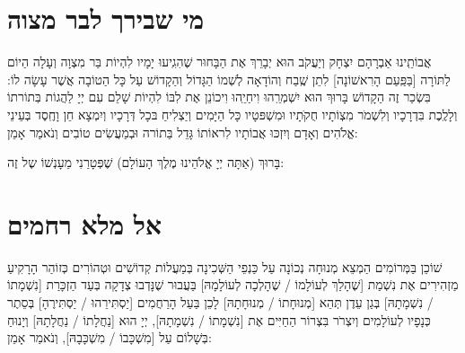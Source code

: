 \documentclass[a4paper, twoside, openany, parskip=half, 10pt]{article}
\begin{document}
\section*{מי שבירך לבר מצוה}
\vspace{-.5\baselineskip}
\begin{multicols}{2}
אֲבוֹתֵֽינוּ אַבְרָהָם יִצְחָק וְיַעֲקֹב הוּא יְבָרֵךְ אֶת הַבָּחוּר
 שֶׁהִגִֽיעוּ יָמָיו לִהְיוֹת בַּר מִצְוָה וְעָלָה הַיוֹם לַתּוֹרָה [בַּפַּֽעַם הָרִאשׁוֹנָה] לִתֵן שֶֽׁבַח וְהוֹדָאָה לְשְׁמוֹ הַגָּדוֹל וְהַקָדוֹשׁ עַל כָּל הַטוֹבָה אֲשֶׁר עָשָׂה לוֹ: בִּשְׂכַר זֶה הַקָדוֹשׁ בָּרוּךְ הוּא יִשְׁמְרֵֽהוּ וִיחַיֵֽהוּ וִיכוֹנֵן אֶת לִבּוֹ לִהְיוֹת שָׁלֵם עִם יְיָ לַהֲגוֹת בּֽתוֹרתוֹ וְלָלֶֽכֶת בִּדְרָכָיו וְלִשְׁמֹר מִצְוֹתָיו חֻקּׂתָיו וּמִשְׁפּטָיו כָּל הַיָּמִים
 וְיַצְלִיחַ בּכָל דְּרָכָיו וְיִמְצָא חֵן וָחֶֽסֶד בְּעֵינֵי אֱלֹהִים וְאָדָם וְיִזְכּוּ אֲבוֹתָיו לִראוֹתוֹ גָּדֵל בַּתוֹרה וּּבְמַעֲשִׂים טוֹבִים
  וְנֹאמַר אָמֵן:
\end{multicols}
בָּרוּךְ (אַתָּה יְיָ אֱלֹהֵינוּ מֶלֶךְ הָעוֹלָם) שֶׁפְּטָרַנִי מֵעָנְשׁוֹ שֶל זֶה:\\

\section*{אל מלא רחמים}
\vspace{-.5\baselineskip}
\begin{multicols}{2}
     שׁוֹכֵן בַּמְּרוֹמִים
    הַמְצֵא מְנוּחָה נְכוֹנָה עַל כַּנְפֵי הַשְּׁכִינָה
    בְּמַעֲלוֹת קְדוֹשִׁים וּטְהוֹרִים כְּזוֹהַר הָרָקִיעַ מַזְהִירִים
אֶת נִשְׁמַת
      [שֶׁהָלַךְ לְעוֹלָמוֹ / שֶׁהָלְכָה לְעוֹלָמָהּ]
בַּעֲבוּר שֶׁנָּדְבוּ  צְדָקָה בְּעַד הַזְכָּרַת [נִשְׁמָתוֹ / נִשְׁמָתָהּ]
    בְּגַן עֵדֶן תְּהֵא [מְנוּחָתוֹ / מְנוּחָתָהּ]
    לָכֵן בַּעַל הָרַחֲמִים
    [יַסְתִּירֵהוּ / יַסְתִּירֶהָ]
    בְּסֵתֶר כְּנָפָיו לְעוֹלָמִים
וְיִצְרֹר בִּצְרוֹר הַחַיִּים אֶת
[נִשְׁמָתוֹ / נִשְׁמָתָהּ],
    יְיָ הוּא [נַחֲלָתוֹ / נַחֲלָתָהּ]
וְיָנוּחַ בְּשָׁלוֹם עַל [מִשְׁכָּבוֹ / מִשְׁכָּבָהּ], וְנֹאמַר אָמֵן:
\end{multicols}
\end{document}
